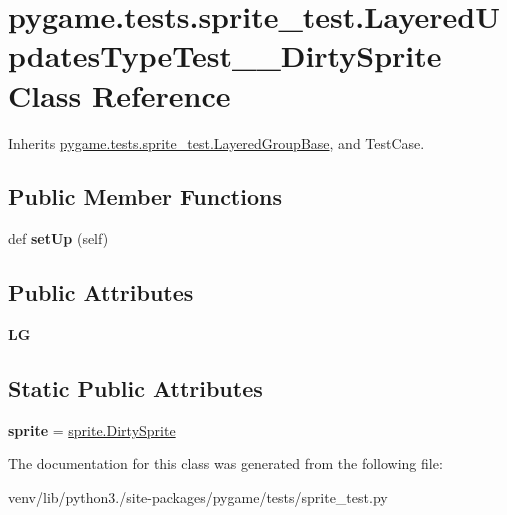 \hypertarget{classpygame_1_1tests_1_1sprite__test_1_1_layered_updates_type_test_____dirty_sprite}{}\section{pygame.\+tests.\+sprite\+\_\+test.\+Layered\+Updates\+Type\+Test\+\_\+\+\_\+\+Dirty\+Sprite Class Reference}
\label{classpygame_1_1tests_1_1sprite__test_1_1_layered_updates_type_test_____dirty_sprite}


Inherits \hyperlink{classpygame_1_1tests_1_1sprite__test_1_1_layered_group_base}{pygame.\+tests.\+sprite\+\_\+test.\+Layered\+Group\+Base}, and Test\+Case.

\subsection*{Public Member Functions}
\begin{DoxyCompactItemize}
\item 
\mbox{\label{classpygame_1_1tests_1_1sprite__test_1_1_layered_updates_type_test_____dirty_sprite_afa577b5d3589816bd7e059627f74fe2b}} 
def {\bfseries set\+Up} (self)
\end{DoxyCompactItemize}
\subsection*{Public Attributes}
\begin{DoxyCompactItemize}
\item 
\mbox{\label{classpygame_1_1tests_1_1sprite__test_1_1_layered_updates_type_test_____dirty_sprite_a0930b1332155fe3171da54d057741181}} 
{\bfseries LG}
\end{DoxyCompactItemize}
\subsection*{Static Public Attributes}
\begin{DoxyCompactItemize}
\item 
\mbox{\label{classpygame_1_1tests_1_1sprite__test_1_1_layered_updates_type_test_____dirty_sprite_aca1ec6828376477ab0e6bcaddb3ccf8d}} 
{\bfseries sprite} = \hyperlink{classpygame_1_1sprite_1_1_dirty_sprite}{sprite.\+Dirty\+Sprite}
\end{DoxyCompactItemize}


The documentation for this class was generated from the following file\+:\begin{DoxyCompactItemize}
\item 
venv/lib/python3./site-\/packages/pygame/tests/sprite\+\_\+test.\+py\end{DoxyCompactItemize}

